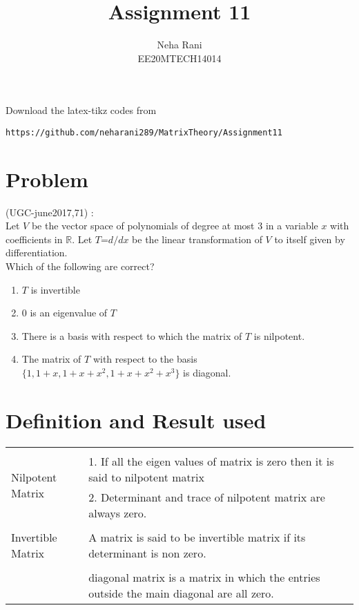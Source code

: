 \documentclass[journal,12pt]{IEEEtran}
\begin{document}
     \def\rightbox#1{\makebox[0in][r]{#1}}
     \def\centbox#1{\makebox[0in]{#1}}
     \def\topbox#1{\raisebox{-\baselineskip}[0in][0in]{#1}}
     \def\midbox#1{\raisebox{-0.5\baselineskip}[0in][0in]{#1}}
\vspace{3cm}
\title{Assignment 11}
\author{Neha Rani\\EE20MTECH14014}
\maketitle
\bigskip
\renewcommand{\thefigure}{\theenumi}
\renewcommand{\thetable}{\theenumi}
%
Download the latex-tikz codes from 
%
\begin{lstlisting}
https://github.com/neharani289/MatrixTheory/Assignment11
\end{lstlisting}
\section{\textbf{Problem}}
(UGC-june2017,71) : \\
%
Let $V$ be the vector space of polynomials of degree at most 3 in a variable $x$ with coefficients in $\mathbb{R}$. Let $T$=$d/dx$ be the linear transformation of $V$ to itself given by differentiation.\\

Which of the following are correct?\\
\begin{enumerate}
\item $T$ is invertible
\item $0$ is an eigenvalue of $T$
\item There is a basis with respect to which the matrix of $T$ is nilpotent.
\item The matrix of $T$ with respect to the basis $\{1,1+x,1+x+x^2,1+x+x^2+x^3\}$ is diagonal.
\end{enumerate}
%
%
%
\section{\textbf{Definition and Result used}}
\begin{longtable}{|l|l|}
\hline
\multirow{3}{*}{Nilpotent Matrix} 
& \\
& 1. If  all the eigen values of matrix is zero then it is said to nilpotent matrix \\
& 
2. Determinant and trace of nilpotent matrix are always zero.\\
\hline
\multirow{3}{*}{Invertible Matrix } & \\
&
A matrix is said to be invertible matrix if its determinant is non zero.\\
\hline
\multirow{3}{*}{Diagonal matrix} & \\
&
diagonal matrix is a matrix in which the entries outside the main diagonal are all zero.\\
\hline
\end{longtable}
\end{document}
